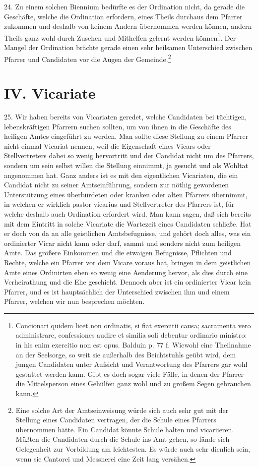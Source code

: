 24. Zu einem solchen Biennium bedürfte es der Ordination nicht, da gerade die Geschäfte, welche die
Ordination erfordern, eines Theils durchaus dem Pfarrer zukommen und deshalb von keinem Andern übernommen werden können, andern Theils ganz wohl durch Zusehen und Mithelfen gelernt werden können\footnote{Concionari quidem licet non ordinatis, si fiat exercitii causa; sacramenta vero administrare, confessiones audire et similia soli debentur ordinario ministro: in his enim exercitio non est opus. Balduin p. 77 f. Wiewohl eine Theilnahme an der Seelsorge, so weit sie außerhalb des Beichtstuhls geübt wird, dem jungen Candidaten unter Aufsicht und Verantwortung des Pfarrers gar wohl gestattet werden kann. Gibt es doch sogar viele Fälle, in denen der Pfarrer die Mittelsperson eines Gehülfen ganz wohl und zu großem Segen gebrauchen kann.}. Der Mangel der Ordination brächte gerade einen sehr heilsamen Unterschied zwischen Pfarrer und Candidaten vor die Augen der Gemeinde.\footnote{Eine solche Art der Amtseinweisung würde sich auch sehr gut mit der Stellung eines Candidaten vertragen, der die Schule eines Pfarrers übernommen hätte. Ein Candidat könnte Schule halten und vicariieren. Müßten die Candidaten durch die Schule ins Amt gehen, so fände sich Gelegenheit zur Vorbildung am leichtesten. Es würde auch sehr dienlich sein, wenn sie Cantorei und Messnerei eine Zeit lang versähen.}

\section{IV. Vicariate}

25. Wir haben bereits von Vicariaten geredet, welche Candidaten bei tüchtigen, lebenskräftigen Pfarrern suchen sollten, um von ihnen in die Geschäfte des heiligen Amtes eingeführt zu werden. Man sollte diese Stellung zu einem
Pfarrer nicht einmal Vicariat nennen, weil die Eigenschaft eines Vicars oder Stellvertreters dabei so wenig hervortritt und der Candidat nicht um des Pfarrers, sondern um sein selbst willen die Stellung einnimmt, ja gesucht und als Wohltat angenommen hat. Ganz anders ist es mit den eigentlichen Vicariaten, die ein Candidat nicht zu seiner Amtseinführung, sondern zur nöthig gewordenen Unterstützung eines überbürdeten oder kranken oder alten Pfarrers übernimmt, in welchen er wirklich pastor vicarius und Stellvertreter des Pfarrers ist, für welche deshalb auch Ordination erfordert wird. Man kann sagen, daß sich bereits mit dem Eintritt in solche Vicariate die Wartezeit eines Candidaten schließe. Hat er doch von da an alle geistlichen Amtsbefugnisse, und gehört doch alles, was ein ordinierter Vicar nicht kann oder darf, sammt und sonders nicht zum heiligen Amte. Das größere Einkommen und die etwaigen Befugnisse, Pflichten und Rechte, welche ein Pfarrer vor dem Vicare voraus hat, bringen in dem geistlichen Amte eines Ordinirten eben so wenig eine Aenderung hervor, als dies durch eine Verheirathung und die Ehe geschieht. Dennoch aber ist ein ordinierter Vicar kein Pfarrer, und es ist hauptsächlich der Unterschied zwischen ihm und einem Pfarrer, welchen wir nun besprechen möchten.

